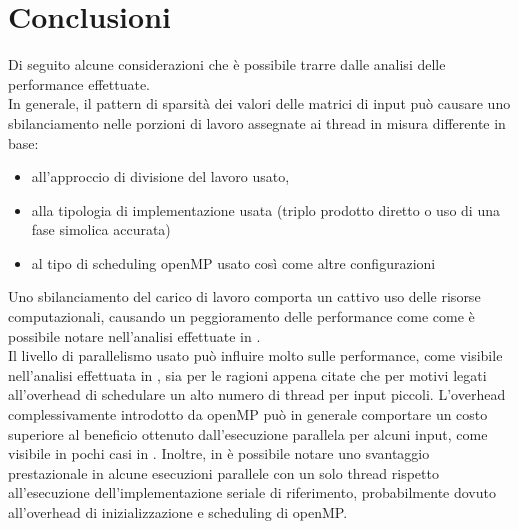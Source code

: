 \section{Conclusioni}
Di seguito alcune considerazioni che è possibile trarre dalle analisi delle performance effettuate.\\
In generale, il pattern di sparsità dei valori \nnz delle matrici di input può causare uno sbilanciamento
nelle porzioni di lavoro assegnate ai thread in misura differente in base:
\begin{itemize}
	\item	all'approccio di divisione del lavoro usato,
	\item	alla tipologia di implementazione usata (triplo prodotto diretto o uso di una fase simolica accurata)
	\item	al tipo di scheduling openMP usato così come altre configurazioni
\end{itemize}
Uno sbilanciamento del carico di lavoro comporta un cattivo uso delle risorse computazionali, causando un peggioramento delle performance 
come come è possibile notare nell'analisi effettuate in .\\
\voidLine
Il livello di parallelismo usato può influire molto sulle performance, come visibile nell'analisi effettuata in ,
sia per le ragioni appena citate che per motivi legati all'overhead di schedulare un alto numero di thread
per input piccoli.
\voidLine
L'overhead complessivamente introdotto da openMP può in generale comportare un costo superiore al beneficio
ottenuto dall'esecuzione parallela per alcuni input, come visibile in pochi casi in .
Inoltre, in  è possibile notare uno svantaggio prestazionale in alcune esecuzioni parallele con un solo thread
rispetto all'esecuzione dell'implementazione seriale di riferimento, 
probabilmente dovuto all'overhead di inizializzazione e scheduling di openMP.\\

